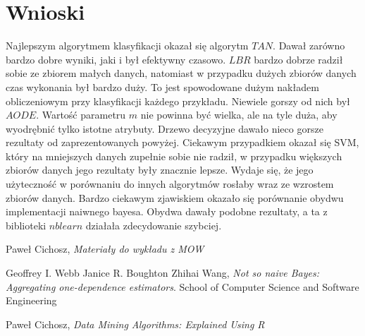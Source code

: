 \documentclass[16]{article}
\begin{document}
\section{Wnioski}
Najlepszym algorytmem klasyfikacji okazał się algorytm $TAN$. Dawał zarówno bardzo dobre wyniki, jaki i był efektywny czasowo. $LBR$ bardzo dobrze radził sobie ze zbiorem małych danych, natomiast w przypadku dużych zbiorów danych czas wykonania był bardzo duży. To jest spowodowane dużym nakładem obliczeniowym przy klasyfikacji każdego przykładu. Niewiele gorszy od nich był $AODE$. Wartość parametru $m$ nie powinna być wielka, ale na tyle duża, aby wyodrębnić tylko istotne atrybuty. Drzewo decyzyjne dawało nieco gorsze rezultaty od zaprezentowanych powyżej. Ciekawym przypadkiem okazał się SVM, który na mniejszych danych zupełnie sobie nie radził, w przypadku większych zbiorów danych jego rezultaty były znacznie lepsze. Wydaje się, że jego użyteczność w porównaniu do innych algorytmów rosłaby wraz ze wzrostem zbiorów danych. Bardzo ciekawym zjawiskiem okazało się porównanie obydwu implementacji naiwnego bayesa. Obydwa dawały podobne rezultaty, a ta z biblioteki $nblearn$ działała zdecydowanie szybciej.

\begin{thebibliography}{9}
	
		Paweł Cichosz,
		\emph{Materiały do wykładu z MOW}
			
		Geoffrey I. Webb
		Janice R. Boughton
		Zhihai Wang,
		\emph{Not so naive Bayes: Aggregating one-dependence estimators}.
		School of Computer Science and Software Engineering
    
		Paweł Cichosz,
		\emph{Data Mining Algorithms: Explained Using R}
\end{thebibliography}
\end{document}

